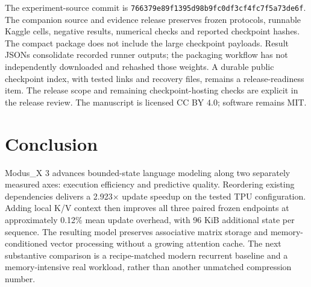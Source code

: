 \documentclass[10pt]{article}
\newcommand{\mx}{Modus\_X}
\begin{document}
The experiment-source commit is
\texttt{766379e89f1395d98b9fc0df3cf4fc7f5a73de6f}.
The companion source and evidence release preserves frozen protocols,
runnable Kaggle cells, negative results, numerical checks and reported checkpoint
hashes. The compact package does not include the large checkpoint payloads.
Result JSONs consolidate recorded runner outputs; the packaging workflow has not
independently downloaded and rehashed those weights. A durable public checkpoint
index, with tested links and recovery files, remains a release-readiness item.
The release scope and remaining checkpoint-hosting checks are explicit in
the release review. The manuscript is licensed CC BY 4.0; software remains MIT.

\section{Conclusion}
\mx{} 3 advances bounded-state language modeling along two separately measured
axes: execution efficiency and predictive quality. Reordering existing dependencies
delivers a 2.923$\times$ update speedup on the tested TPU configuration. Adding
local K/V context then improves all three paired frozen endpoints at approximately
0.12\% mean update overhead, with 96 KiB additional state per sequence.
The resulting model preserves associative matrix storage and memory-conditioned
vector processing without a growing attention cache. The next substantive
comparison is a recipe-matched modern recurrent baseline and a memory-intensive
real workload, rather than another unmatched compression number.
\end{document}
